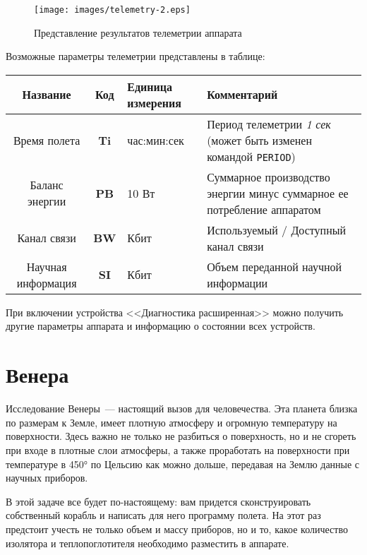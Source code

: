\documentclass[12pt,a4paper]{article}
\begin{document}
\begin{figure}[tbh]
  \begin{center}
    \texttt{[image: images/telemetry-2.eps]}
    \caption{Представление результатов телеметрии аппарата}
    \label{Pic:telemetry-2}
  \end{center}
\end{figure}

Возможные параметры телеметрии представлены в таблице:

\begin{center}
\begin{tabular}{ |c|c|p{2.5cm}|p{6cm}| } 
  \hline
  \textbf{Название} & \textbf{Код} & \textbf{Единица измерения} & \textbf{Комментарий} \\
  \hline
  Время полета & \textbf{Ti} & час:мин:сек & Период телеметрии \emph{1 сек} (может быть
  изменен командой \verb'PERIOD')\\
  \hline
  Баланс энергии & \textbf{PB} & 10 Вт & Суммарное производство энергии минус суммарное ее
  потребление аппаратом\\
  \hline
  Канал связи & \textbf{BW} & Кбит & Используемый / Доступный канал связи\\
  \hline
  Научная информация & \textbf{SI} & Кбит & Объем переданной научной информации\\
  \hline
\end{tabular}
\end{center}

При включении устройства <<Диагностика расширенная>> можно получить другие параметры
аппарата и информацию о состоянии всех устройств.

\section{Венера}

Исследование Венеры~--- настоящий вызов для человечества. Эта планета близка по размерам к
Земле, имеет плотную атмосферу и огромную температуру на поверхности. Здесь важно не
только не разбиться о поверхность, но и не сгореть при входе в плотные слои атмосферы, а
также проработать на поверхности при температуре в 450° по Цельсию как можно дольше,
передавая на Землю данные с научных приборов.

В этой задаче все будет по-настоящему: вам придется сконструировать собственный корабль и
написать для него программу полета. На этот раз предстоит учесть не только объем и массу
приборов, но и то, какое количество изолятора и теплопоглотителя необходимо разместить в
аппарате.
\end{document}
